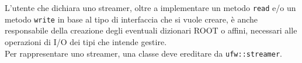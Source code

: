 \documentclass[../../main.tex]{subfiles}
\begin{document}
    L'utente che dichiara uno streamer, oltre a implementare un metodo
    \texttt{read} e/o un metodo \texttt{write} in base al tipo di interfaccia
    che si vuole creare, è anche responsabile della creazione degli eventuali
    dizionari ROOT o affini, necessari alle operazioni di I/O dei tipi che
    intende gestire.\\
    Per rappresentare uno streamer, una classe deve ereditare da
    \texttt{ufw::streamer}.
\end{document}
